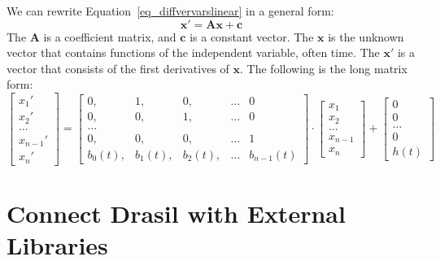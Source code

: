 We can rewrite Equation~\ref{eq_diffvervarslinear} in a general form:
\begin{equation} \label{eq_foode}
  \boldsymbol{x}' = \boldsymbol{Ax} + \boldsymbol{c}
\end{equation}
The $\boldsymbol{A}$ is a coefficient matrix, and $\boldsymbol{c}$ is a constant vector. The $\boldsymbol{x}$ is the unknown vector that contains functions of the independent variable, often time. The $\boldsymbol{x'}$ is a vector that consists of the first derivatives of $\boldsymbol{x}$. The following is the long matrix form:
\begin{equation} \label{eq_foodeexample}
	\begin{bmatrix}
		x_{1}' \\
    x_{2}' \\
    \dots  \\
    x_{n-1}' \\
    x_{n}'
	\end{bmatrix}
    = 
  \begin{bmatrix}
		0, & 1, & 0, & \dots & 0 \\
    0, & 0, & 1, & \dots & 0 \\
    \dots \\
    0, & 0, & 0, & \dots & 1 \\
    b_{0}(t), & b_{1}(t), & b_{2}(t), & \dots & b_{n-1}(t)
	\end{bmatrix}
    \cdot
  \begin{bmatrix}
		x_{1} \\
    x_{2} \\
    \dots  \\
    x_{n-1} \\
    x_{n}
	\end{bmatrix}
    + 
  \begin{bmatrix}
    0 \\
    0 \\
    \dots  \\
    0 \\
    h(t)
	\end{bmatrix}
\end{equation}

\section{Connect Drasil with External Libraries}
\label{se_connecteetolib}

